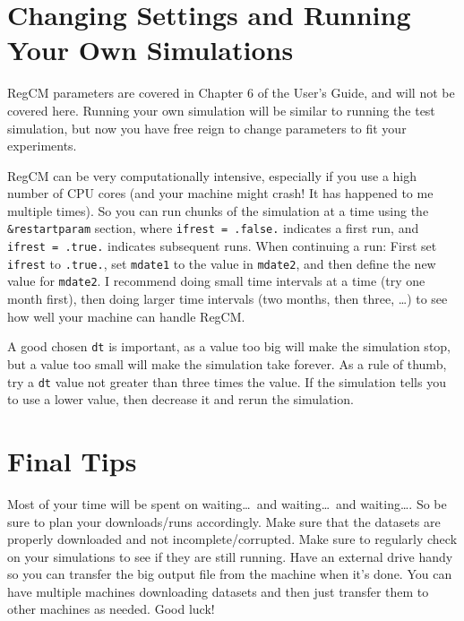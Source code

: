 \section{Changing Settings and Running Your Own Simulations}
	RegCM parameters are covered in Chapter 6 of the User's Guide, and will not be covered here.
	Running your own simulation will be similar to running the test simulation, but now you have free reign to change parameters to fit your experiments.
	
	RegCM can be very computationally intensive, especially if you use a high number of CPU cores (and your machine might crash! It has happened to me multiple times).
	So you can run chunks of the simulation at a time using the 
	\texttt{\&restartparam} section, where \texttt{ifrest = .false.} indicates a first run, and \texttt{ifrest = .true.} indicates subsequent runs.
	When continuing a run:
		First set \texttt{ifrest} to \texttt{.true.},
		set \texttt{mdate1} to the value in \texttt{mdate2},
		and then
		define the new value for \texttt{mdate2}.
	I recommend doing small time intervals at a time (try one month first), then doing larger time intervals (two months, then three, \dots) to see how well your machine can handle RegCM.
	
	A good chosen \texttt{dt} is important, as a value too big will make the simulation stop, but a value too small will make the simulation take forever.
	As a rule of thumb, try a \texttt{dt} value not greater than three times the  value.
	If the simulation tells you to use a lower value, then decrease it and rerun the simulation.
	
\section{Final Tips}
	Most of your time will be spent on waiting\dots\ and waiting\dots\ and waiting\dots.
	So be sure to plan your downloads/runs accordingly.
	Make sure that the datasets are properly downloaded and not incomplete/corrupted.
	Make sure to regularly check on your simulations to see if they are still running.
	Have an external drive handy so you can transfer the big output file from the machine when it's done.
	You can have multiple machines downloading datasets and then just transfer them to other machines as needed.
	Good luck!